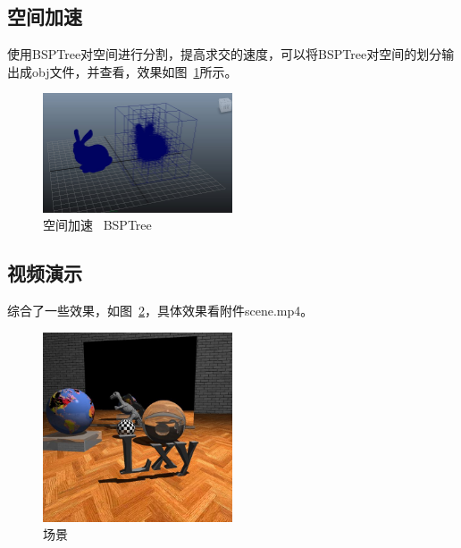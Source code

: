 \documentclass{article}
\begin{document}
\subsection{空间加速}
使用BSPTree对空间进行分割，提高求交的速度，可以将BSPTree对空间的划分输出成obj文件，并查看，效果如图~\ref{fig:bsptree}所示。
\begin{figure}[H]
    \centering
    \includegraphics[width=0.5\textwidth]{20.jpg}
    \caption{空间加速 \ BSPTree}
    \label{fig:bsptree}
\end{figure}
\subsection{视频演示}
综合了一些效果，如图~\ref{fig:scene}，具体效果看附件scene.mp4。
\begin{figure}[H]
    \centering
    \includegraphics[width=0.5\textwidth]{24.jpg}
    \caption{场景}
    \label{fig:scene}
\end{figure}
\end{document}
